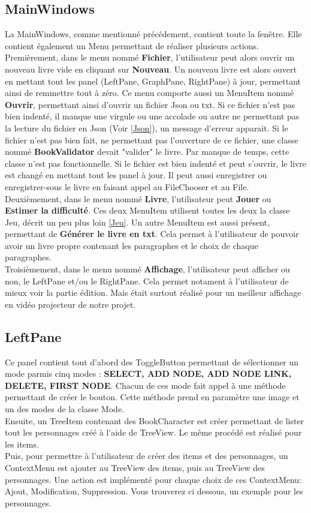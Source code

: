 		\subsection{MainWindows}
			La MainWindows, comme mentionné précédement, contient toute la fenêtre. Elle contient également un Menu permettant de réaliser plusieurs actions.\\
			Premièrement, dans le menu nommé \textbf{Fichier}, l'utilisateur peut alors ouvrir un nouveau livre vide en cliquant sur \textbf{Nouveau}. Un nouveau livre est alors ouvert en mettant tout les panel (LeftPane, GraphPane, RightPane) à jour, permettant ainsi de remmettre tout à zéro. Ce menu comporte aussi un MenuItem nommé \textbf{Ouvrir}, permettant ainsi d'ouvrir un fichier Json ou txt. Si ce fichier n'est pas bien indenté, il manque une virgule ou une accolade ou autre ne permettant pas la lecture du fichier en Json (Voir \ref{Json}), un message d'erreur apparait. Si le fichier n'est pas bien fait, ne permettant pas l'ouverture de ce fichier, une classe nommé \textbf{BookValidator} devait "valider" le livre. Par manque de temps, cette classe n'est pas fonctionnelle. Si le fichier est bien indenté et peut s'ouvrir, le livre est changé en mettant tout les panel à jour. Il peut aussi enregistrer ou enregistrer-sous le livre en faisant appel au FileChooser et au File.\\
			Deuxièmement, dans le menu nommé \textbf{Livre}, l'utilisateur peut \textbf{Jouer} ou \textbf{Estimer la difficulté}. Ces deux MenuItem utilisent toutes les deux la classe Jeu, décrit un peu plus loin \ref{Jeu}. Un autre MenuItem est aussi présent, permettant de \textbf{Générer le livre en txt}. Cela permet à l'utilisateur de pouvoir avoir un livre propre contenant les paragraphes et le choix de chaque paragraphes.\\
			Troisièmement, dans le menu nommé \textbf{Affichage}, l'utilisateur peut afficher ou non, le LeftPane et/ou le RightPane. Cela permet notament à l'utilisateur de mieux voir la partie édition. Mais était surtout réalisé pour un meilleur affichage en vidéo projecteur de notre projet.\\


		\subsection{LeftPane}
			Ce panel contient tout d'abord des ToggleButton permettant de sélectionner un mode parmis cinq modes : \textbf{SELECT, ADD NODE, ADD NODE LINK, DELETE, FIRST NODE}. Chacun de ces mode fait appel à une méthode permettant de créer le bouton. Cette méthode prend en paramètre une image et un des modes de la classe Mode.\\
			Ensuite, un TreeItem contenant des BookCharacter est créer permettant de lister tout les personnages créé à l'aide de TreeView. Le même procédé est réalisé pour les items.\\
			Puis, pour permettre à l'utilisateur de créer des items et des personnages, un ContextMenu est ajouter au TreeView des items, puis au TreeView des personnages. Une action est implémenté pour chaque choix de ces ContextMenu: Ajout, Modification, Suppression. Vous trouverez ci dessous, un exemple pour les personnages.

